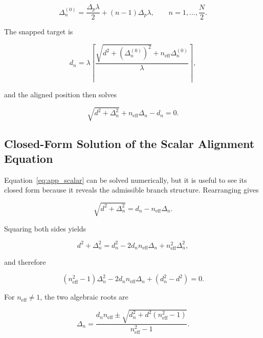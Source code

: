 \begin{equation}
\Delta_n^{(0)}
= \frac{\Delta_p \lambda}{2} + (n-1)\Delta_p\lambda,
\qquad n = 1,\ldots,\frac{N}{2}.
\label{eq:app_init}
\end{equation}

The snapped target is

\begin{equation}
d_n
= \lambda
\left\lceil
\frac{\sqrt{d^2+(\Delta_n^{(0)})^2}+n_{\mathrm{eff}}\Delta_n^{(0)}}{\lambda}
\right\rceil,
\label{eq:app_dn}
\end{equation}

and the aligned position then solves

\begin{equation}
\sqrt{d^2+\Delta_n^2}+n_{\mathrm{eff}}\Delta_n-d_n=0.
\label{eq:app_scalar}
\end{equation}

\subsection{Closed-Form Solution of the Scalar Alignment Equation}

Equation~\eqref{eq:app_scalar} can be solved numerically, but it is useful to see its closed form because it reveals the admissible branch structure. Rearranging gives

\begin{equation}
\sqrt{d^2+\Delta_n^2}=d_n-n_{\mathrm{eff}}\Delta_n.
\label{eq:app_rearranged}
\end{equation}

Squaring both sides yields

\begin{equation}
d^2+\Delta_n^2
= d_n^2 - 2 d_n n_{\mathrm{eff}}\Delta_n + n_{\mathrm{eff}}^2 \Delta_n^2,
\label{eq:app_squared}
\end{equation}

and therefore

\begin{equation}
(n_{\mathrm{eff}}^2-1)\Delta_n^2
- 2 d_n n_{\mathrm{eff}}\Delta_n
+ (d_n^2-d^2)=0.
\label{eq:app_quadratic}
\end{equation}

For $n_{\mathrm{eff}} \ne 1$, the two algebraic roots are

\begin{equation}
\Delta_n
= \frac{d_n n_{\mathrm{eff}} \pm \sqrt{d_n^2 + d^2(n_{\mathrm{eff}}^2-1)}}{n_{\mathrm{eff}}^2-1}.
\label{eq:app_roots}
\end{equation}


